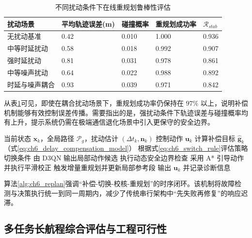 \documentclass[UTF8,zihao=-4,a4paper,oneside,openany]{ctexrep}
\numberwithin{equation}{chapter}
\renewcommand{\small}{\normalsize}
\renewcommand{\small}{\normalsize}
\theoremstyle{plain}
\theoremstyle{definition}
\begin{document}
\begin{table}[H]
\centering
\small
\caption{不同扰动条件下在线重规划鲁棒性评估}
\label{tab:ch6_robustness}
\begin{tabular}{p{}p{}p{}p{}p{}}
\toprule
扰动场景 & 平均轨迹误差(m) & 碰撞概率 & 重规划成功率 & $\mathcal{R}_{stab}$ \\
\midrule
无扰动基准 & 0.42 & 0.010 & 1.000 & 0.936 \\
中等时延扰动 & 0.58 & 0.018 & 0.992 & 0.907 \\
强时延扰动 & 0.81 & 0.031 & 0.978 & 0.861 \\
中等噪声扰动 & 0.64 & 0.022 & 0.988 & 0.892 \\
时延与噪声耦合 & 0.93 & 0.039 & 0.971 & 0.842 \\
\bottomrule
\end{tabular}
\end{table}

从表\ref{tab:ch6_robustness}可见，即使在耦合扰动场景下，重规划成功率仍保持在 $97\%$ 以上，说明补偿机制能够有效控制误差传播。需要指出的是，强扰动条件下轨迹误差与碰撞概率均有上升，提示系统仍需在极端通信退化场景中引入更保守的安全边界。

\begin{algorithm}[H]
\caption{在线增量重规划与容错执行伪代码}
\label{alg:ch6_replan}
\begin{algorithmic}[1]
\REQUIRE 当前状态 $\mathbf{x}_k$，全局路径 $\mathcal{P}_g$，扰动估计 $(\Delta t_k,\mathbf{n}_k)$
\ENSURE 控制动作 $\mathbf{u}_k$
\STATE 计算补偿目标 $\hat{\mathbf{g}}_k$（式\eqref{eq:ch6_delay_compensation_model}）
\STATE 根据式\eqref{eq:ch6_switch_rule}评估策略切换条件
    \STATE 由 D3QN 输出局部动作候选
    \STATE 执行动态安全边界检查
\ELSE
    \STATE 采用 A* 引导动作并执行平滑校正
\ENDIF
{}
    \STATE 触发增量重规划并更新局部参考段
\ENDIF
\STATE 输出 $\mathbf{u}_k$ 并记录诊断信息
\end{algorithmic}
\end{algorithm}

算法\ref{alg:ch6_replan}强调“补偿-切换-校核-重规划”的时序闭环。该机制将故障检测与决策执行统一到同一周期内，减少了传统串行架构中“先失败再修复”的响应迟滞。

\subsection{多任务长航程综合评估与工程可行性}
\label{subsec:ch6_long_horizon}
\end{document}
